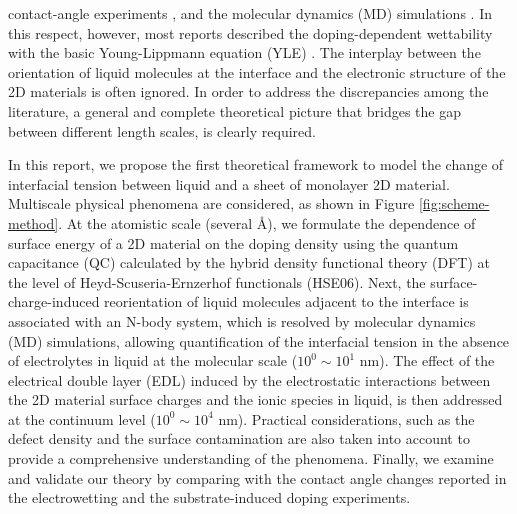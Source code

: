 \documentclass[journal=langd5,manuscript=article,email=true,hyperref=true,keywords=true]{achemso}
\begin{document}
contact-angle experiments
\cite{hong_mechanism_2016,goniszewski_correlation_2016,ashraf_doping-induced_2016},
and the molecular dynamics (MD) simulations
\cite{ostrowski_tunable_2014,ren_interfacial_2015,Taherian_2015,daub_electrowetting_2007}. In
this respect, however, most reports described the doping-dependent
wettability with the basic Young-Lippmann equation (YLE)
\cite{Lippmann_1875}. The interplay between the orientation of
liquid molecules at the interface \cite{Shen_2006} and the electronic
structure of the 2D materials is often ignored. In order to address
the discrepancies among the literature, a general and complete
theoretical picture that bridges the gap between different length
scales, is clearly required.


In this report, we propose the first theoretical framework to model
the change of interfacial tension between liquid and a sheet of
monolayer 2D material. Multiscale physical phenomena are considered,
as shown in Figure \ref{fig:scheme-method}. At the atomistic scale
(several \AA{}), we formulate the dependence of surface energy of a 2D
material on the doping density using the quantum capacitance (QC)
calculated by the hybrid density functional theory (DFT) at the level
of Heyd-Scuseria-Ernzerhof functionals (HSE06). Next, the
surface-charge-induced reorientation of liquid molecules adjacent to
the interface is associated with an N-body system, which is resolved
by molecular dynamics (MD) simulations, allowing quantification of the
interfacial tension in the absence of electrolytes in liquid at the
molecular scale (\(10^{0} \sim 10^{1}\) nm). The effect of the electrical
double layer (EDL) induced by the electrostatic interactions between
the 2D material surface charges and the ionic species in liquid, is
then addressed at the continuum level (\(10^{0} \sim 10^{4}\) nm). Practical
considerations, such as the defect density and the surface
contamination are also taken into account to provide a comprehensive
understanding of the phenomena. Finally, we examine and validate our
theory by comparing with the contact angle changes reported in the
electrowetting and the substrate-induced doping experiments.
\end{document}
